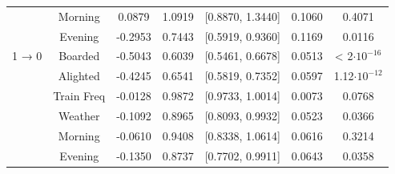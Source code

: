 \documentclass[11pt]{article}
\begin{document}
\begin{table}[htbp]
{\begin{tabular}{|l|c|c|c|c|c|c|}
 & Morning & 0.0879 & 1.0919 & [0.8870, 1.3440] & 0.1060 & 0.4071\\
 & Evening & -0.2953 & 0.7443 & [0.5919, 0.9360] & 0.1169 & 0.0116\\
 \hline
 1 → 0 & Boarded & -0.5043 & 0.6039 & [0.5461, 0.6678] & 0.0513 &  < 2\(\cdot10^{-16}\) \\
 & Alighted & -0.4245 & 0.6541 & [0.5819, 0.7352] & 0.0597 & 1.12\(\cdot10^{-12}\)\\
 & Train Freq & -0.0128 & 0.9872 & [0.9733, 1.0014] & 0.0073 & 0.0768\\
 & Weather & -0.1092 & 0.8965 & [0.8093, 0.9932] & 0.0523 & 0.0366\\
 & Morning & -0.0610 & 0.9408 & [0.8338, 1.0614] & 0.0616 & 0.3214\\
 & Evening & -0.1350 & 0.8737 & [0.7702, 0.9911] & 0.0643 & 0.0358\\
\hline
\end{tabular}
}
\end{table}
\end{document}
